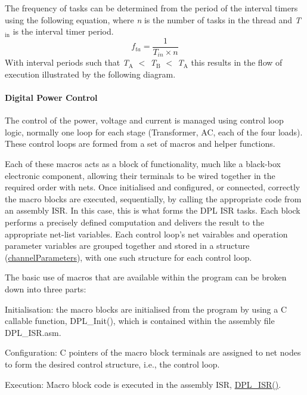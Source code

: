 The frequency of tasks can be determined from the period of the interval timers using the following equation, where {\itshape n} is the number of tasks in the thread and {\itshape T$_{\mbox{in}}$ } is the interval timer period. \[ f_{ta}= \frac{1}{T_{in} \times n} \] With interval periods such that {\itshape T$_{\mbox{A}}$ } {\ttfamily $<$} {\itshape T$_{\mbox{B}}$ } {\ttfamily $<$} {\itshape T$_{\mbox{A}}$ } this results in the flow of execution illustrated by the following diagram.



\paragraph*{Digital Power Control}

The control of the power, voltage and current is managed using control loop logic, normally one loop for each stage (Transformer, A\-C, each of the four loads). These control loops are formed from a set of macros and helper functions.

Each of these macros acts as a block of functionality, much like a black-\/box electronic component, allowing their terminals to be wired together in the required order with nets. Once initialised and configured, or connected, correctly the macro blocks are executed, sequentially, by calling the appropriate code from an assembly I\-S\-R. In this case, this is what forms the D\-P\-L I\-S\-R tasks. Each block performs a precisely defined computation and delivers the result to the appropriate net-\/list variables. Each control loop's net vairables and operation parameter variables are grouped together and stored in a structure (\hyperlink{structchannel_parameters}{channel\-Parameters}), with one such structure for each control loop.

The basic use of macros that are available within the program can be broken down into three parts\-:
\begin{DoxyEnumerate}
\item Initialisation\-: the macro blocks are initialised from the program by using a C callable function, D\-P\-L\-\_\-\-Init(), which is contained within the assembly file D\-P\-L\-\_\-\-I\-S\-R.\-asm.
\item Configuration\-: C pointers of the macro block terminals are assigned to net nodes to form the desired control structure, i.\-e., the control loop.
\item Execution\-: Macro block code is executed in the assembly I\-S\-R, \hyperlink{_pwm_8h_a5532a53363218854b0e4b15049d773f7}{D\-P\-L\-\_\-\-I\-S\-R()}.
\end{DoxyEnumerate}

